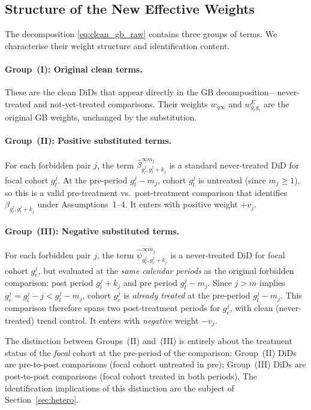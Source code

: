 \documentclass[12pt,letterpaper]{article}
\theoremstyle{remark}
\theoremstyle{definition}
\newcommand{\hbeta}{\hat{\beta}}
\newcommand{\hpsi}{\hat{\psi}}     %
\begin{document}
\subsection{Structure of the New Effective Weights}
\label{sec:weights}

The decomposition \eqref{eq:clean_gb_raw} contains three groups of terms. We
characterise their weight structure and identification content.

\paragraph{Group~(I): Original clean terms.}
These are the clean DiDs that appear directly in the GB decomposition---never-
treated and not-yet-treated comparisons. Their weights $w_{g\infty}$ and
$w_{g_e g_l}^E$ are the original GB weights, unchanged by the substitution.

\paragraph{Group~(II): Positive substituted terms.}
For each forbidden pair $j$, the term $\hbeta^{\infty m_j}_{g_l^j, g_l^j+k_j}$
is a standard never-treated DiD for focal cohort $g_l^j$. At the pre-period
$g_l^j - m_j$, cohort $g_l^j$ is untreated (since $m_j \geq 1$), so this is a
valid pre-treatment vs.\ post-treatment comparison that identifies
$\beta_{g_l^j, g_l^j+k_j}$ under Assumptions~1--4. It enters with positive
weight $+v_j$.

\paragraph{Group~(III): Negative substituted terms.}
For each forbidden pair $j$, the term $\hpsi^{\infty m_j}_{g_e^j, g_l^j+k_j}$
is a never-treated DiD for focal cohort $g_e^j$, but evaluated at the
\emph{same calendar periods} as the original forbidden comparison: post period
$g_l^j + k_j$ and pre period $g_l^j - m_j$. Since $j > m$ implies
$g_e^j = g_l^j - j < g_l^j - m_j$, cohort $g_e^j$ is \emph{already treated}
at the pre-period $g_l^j - m_j$. This comparison therefore spans two
post-treatment periods for $g_e^j$, with clean (never-treated) trend control.
It enters with \emph{negative} weight $-v_j$.

The distinction between Groups~(II) and~(III) is entirely about the treatment
status of the \emph{focal} cohort at the pre-period of the comparison:
Group~(II) DiDs are pre-to-post comparisons (focal cohort untreated in pre);
Group~(III) DiDs are post-to-post comparisons (focal cohort treated in both
periods). The identification implications of this distinction are the subject of
Section~\ref{sec:hetero}.
\end{document}
